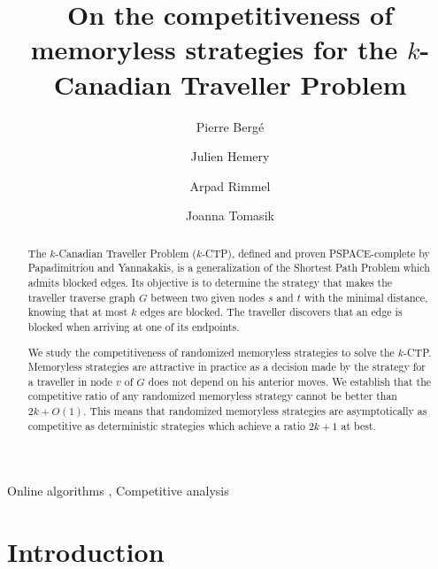 \documentclass[preprint]{elsarticle}
\newcommand{\kctp}{$k$-CTP}
\begin{document}
\title{On the competitiveness of memoryless strategies for the $k$-Canadian Traveller Problem}
\author[upsud]{Pierre Berg\'e }
\author[upsud]{Julien Hemery}
\author[cs]{Arpad Rimmel}
\author[cs]{Joanna Tomasik}
\address[upsud]{LRI, Universit\'e Paris-Sud, Universit\'e Paris-Saclay, 91405 Orsay Cedex, France}
\address[cs]{LRI, CentraleSup\' elec, Universit\'e Paris-Saclay, 91405 Orsay Cedex, France}

\begin{abstract}
The $k$-Canadian Traveller Problem (\kctp ), defined and proven PSPACE-complete by Papadimitriou and Yannakakis, is a generalization of the Shortest Path Problem which admits blocked edges. Its objective is to determine the strategy that makes the traveller traverse graph $G$ between two given nodes $s$ and $t$ with the minimal distance, knowing that at most $k$ edges are blocked. The traveller discovers that an edge is blocked when arriving at one of its endpoints. 
 
We study the competitiveness of randomized memoryless strategies to solve the \kctp . Memoryless strategies are attractive in practice as a decision made by the strategy for a traveller in node $v$ of $G$ does not depend on his anterior moves. We establish that the competitive ratio of any randomized memoryless strategy cannot be better than $2k + O\left(1\right)$. This means that randomized memoryless strategies are asymptotically as competitive as deterministic strategies which achieve a ratio $2k+1$ at best.
\end{abstract}

\begin{keyword}Online algorithms \sep%
    Competitive analysis
\end{keyword}

\maketitle


\section{Introduction}
\end{document}
